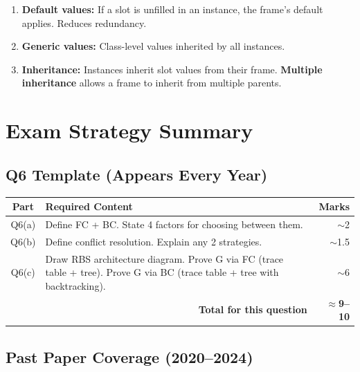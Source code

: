 \documentclass[12pt,a4paper]{article}
\begin{document}
\begin{enumerate}[itemsep=4pt]
  \item \textbf{Default values:} If a slot is unfilled in an instance, the frame's default applies.
        Reduces redundancy.
  \item \textbf{Generic values:} Class-level values inherited by all instances.
  \item \textbf{Inheritance:} Instances inherit slot values from their frame.
        \textbf{Multiple inheritance} allows a frame to inherit from multiple parents.
\end{enumerate}

\section{Exam Strategy Summary}

\subsection{Q6 Template (Appears Every Year)}

\begin{center}
\renewcommand{\arraystretch}{1.4}
\begin{tabular}{c p{8.5cm} r}
\toprule
\textbf{Part} & \textbf{Required Content} & \textbf{Marks} \\
\midrule
Q6(a) & Define FC + BC. State 4 factors for choosing between them. & $\sim$2 \\
Q6(b) & Define conflict resolution. Explain any 2 strategies. & $\sim$1.5 \\
Q6(c) & Draw RBS architecture diagram. Prove G via FC (trace table + tree).
        Prove G via BC (trace table + tree with backtracking). & $\sim$6 \\
\midrule
\multicolumn{2}{r}{\textbf{Total for this question}} & \textbf{$\approx$9--10} \\
\bottomrule
\end{tabular}
\end{center}

\subsection{Past Paper Coverage (2020--2024)}
\end{document}
